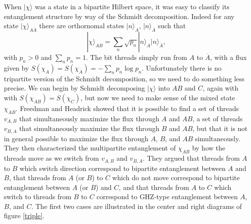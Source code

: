 \documentclass[12pt]{article}
\newcommand{\be}{\begin{equation}}
\newcommand{\ee}{\end{equation}}
\newcommand{\ran}{\rangle}
\newcommand{\Ab}{\ol{A}}
\newcommand{\ol}{\overline}
\begin{document}
When $|\chi\ran$ was a state in a bipartite Hilbert space, it was easy to classify its entanglement structure by way of the Schmidt decomposition. Indeed for any state $|\chi\ran_{A\Ab}$ there are orthornomal states $|n\ran_A$, $|n\ran_{\Ab}$ such that
\be
|\chi\ran_{AB}=\sum_n \sqrt{p_n} |n\ran_A |n\ran_{\Ab},
\ee
with  $p_n>0$ and $\sum_n p_n=1$.  The bit threads simply run from $A$ to $\Ab$, with a flux given by $S(\chi_A)=S(\chi_{\Ab})=-\sum_n p_n \log p_n$.  Unfortunately there is no tripartite version of the Schmidt decomposition, so we need to do something less precise.  We can begin by Schmidt decomposing $|\chi\ran$ into $AB$ and $C$, again with with $S(\chi_{AB})=S(\chi_{C})$, but now we need to make sense of the mixed state $\chi_{AB}$.  Freedman and Headrick showed that it is possible to find a set of threads $v_{A,B}$ that simultaneously maximize the flux through $A$ and $AB$, a set of threads $v_{B,A}$ that simultaneously maximize the flux through $B$ and $AB$, but that it is not in general possible to maximize the flux through $A$, $B$, and $AB$ simultaneously.  They then characterized the multipartite entanglement of $\chi_{AB}$ by how the threads move as we switch from $v_{A,B}$ and $v_{B,A}$.  They argued that threads from $A$ to $B$ which switch direction correspond to bipartite entanglement between $A$ and $B$, that threads from $A$ (or $B$) to $C$ which do not move correspond to bipartite entanglement between $A$ (or $B$) and $C$, and that threads from $A$ to $C$ which switch to threads from $B$ to $C$ correspond to GHZ-type entanglement between $A$, $B$, and $C$.   The first two cases are illustrated in the center and right diagrams of figure \ref{triple}.  
\end{document}
